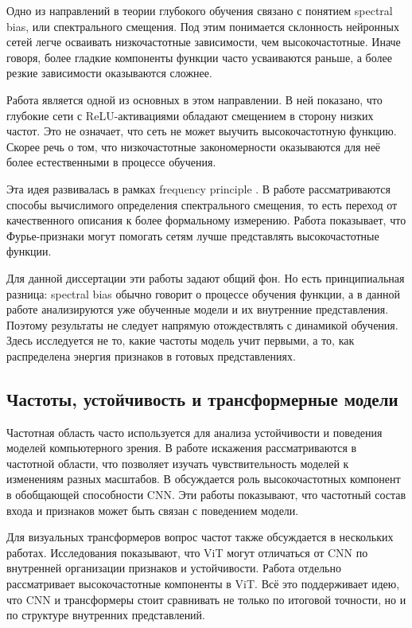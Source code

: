 Одно из направлений в теории глубокого обучения связано с понятием spectral bias, или спектрального смещения. Под этим понимается склонность нейронных сетей легче осваивать низкочастотные зависимости, чем высокочастотные. Иначе говоря, более гладкие компоненты функции часто усваиваются раньше, а более резкие зависимости оказываются сложнее.

Работа \cite{rahaman2019spectral} является одной из основных в этом направлении. В ней показано, что глубокие сети с ReLU-активациями обладают смещением в сторону низких частот. Это не означает, что сеть не может выучить высокочастотную функцию. Скорее речь о том, что низкочастотные закономерности оказываются для неё более естественными в процессе обучения.

Эта идея развивалась в рамках frequency principle \cite{xu2025overview}. В работе \cite{kiessling2022computable} рассматриваются способы вычислимого определения спектрального смещения, то есть переход от качественного описания к более формальному измерению. Работа \cite{tancik2020fourier} показывает, что Фурье-признаки могут помогать сетям лучше представлять высокочастотные функции.

Для данной диссертации эти работы задают общий фон. Но есть принципиальная разница: spectral bias обычно говорит о процессе обучения функции, а в данной работе анализируются уже обученные модели и их внутренние представления. Поэтому результаты не следует напрямую отождествлять с динамикой обучения. Здесь исследуется не то, какие частоты модель учит первыми, а то, как распределена энергия признаков в готовых представлениях.

\subsection{Частоты, устойчивость и трансформерные модели}

Частотная область часто используется для анализа устойчивости и поведения моделей компьютерного зрения. В работе \cite{yin2019fourier} искажения рассматриваются в частотной области, что позволяет изучать чувствительность моделей к изменениям разных масштабов. В \cite{wang2020highfrequency} обсуждается роль высокочастотных компонент в обобщающей способности CNN. Эти работы показывают, что частотный состав входа и признаков может быть связан с поведением модели.

Для визуальных трансформеров вопрос частот также обсуждается в нескольких работах. Исследования \cite{naseer2021intriguing,paul2022vision,alijani2024vision} показывают, что ViT могут отличаться от CNN по внутренней организации признаков и устойчивости. Работа \cite{bai2022improving} отдельно рассматривает высокочастотные компоненты в ViT. Всё это поддерживает идею, что CNN и трансформеры стоит сравнивать не только по итоговой точности, но и по структуре внутренних представлений.

